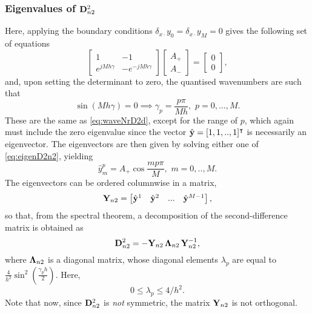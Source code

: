 \documentclass[11pt,twoside,a4paper,english]{book}
\newcommand{\dsd}{\delta_{x\cdot}}
\begin{document}
\subsubsection{Eigenvalues of ${\bf D}^2_{n2}$}


Here, applying the boundary conditions $\dsd y_0 = \dsd y_M = 0$ gives the following set of equations
\begin{equation}\label{eq:eigenD2n2}
\begin{bmatrix}
1 & -1 \\
e^{jMh\gamma} & -e^{-jMh\gamma}
\end{bmatrix}
\begin{bmatrix}
A_+ \\
A_-
\end{bmatrix}=
\begin{bmatrix}
0 \\
0
\end{bmatrix},
\end{equation}
and, upon setting the determinant to zero, the quantised wavenumbers are such that
\begin{equation}\label{eq:EigenvaluesD2n2}
\sin ({Mh\gamma}) = 0  \implies  \gamma_p = \frac{p \pi}{M h}, \,\, p = 0,...,M.
\end{equation}
These are the same as \eqref{eq:waveNrD2d}, except for the range of $p$, which again must include the zero eigenvalue since the vector $\hat {\bf y}=[1,1,..,1]^\intercal$ is necessarily an eigenvector. The eigenvectors are then given by solving either one of \eqref{eq:eigenD2n2}, yielding
\begin{equation}
\hat y^p_m=A_+\cos\frac{m p \pi}{M}, \,\, m = 0,..,M.
\end{equation}
The eigenvectors can be ordered columnwise in a matrix,
\begin{equation}
{\bf Y}_{n2} = \begin{bmatrix}\hat {\bf y}^1 & \hat{\bf y}^2 & ... & \hat{\bf y}^{M-1}\end{bmatrix},
\end{equation}
so that, from the spectral theorem, a decomposition of the second-difference matrix is obtained as
\begin{equation}\label{eq:DecompD2n2}
{\bf D}^{2}_{n2} = -{\bf Y}_{n2} \, {\bf \Lambda}_{n2} \, {\bf Y}^{-1}_{n2},
\end{equation}
where ${{\bf \Lambda}_{n2}}$ is a diagonal matrix, whose diagonal elements $\lambda_p$ are equal to $\frac{4}{h^2}\sin^2 \left( \frac{\gamma_p h}{2}\right)$. Here, 
\begin{equation}\label{eq:BndLambdaD2n2}
0 \leq \lambda_p \leq 4/h^2.
\end{equation}
Note that now, since ${\bf D}^2_{n2}$ is \emph{not} symmetric, the matrix ${\bf Y}_{n2}$ is not orthogonal. 
\end{document}
